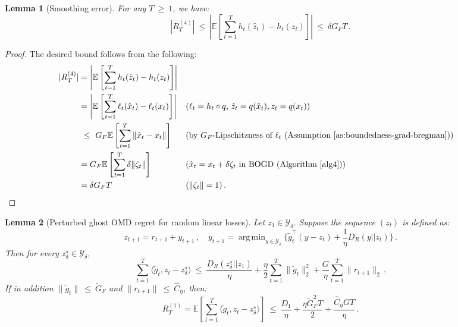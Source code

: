 \documentclass[a4paper,11pt,fullpage]{article}
\def\Y{{\mathcal Y}}
\theoremstyle{plain}
\newtheorem{lemma}{Lemma}
\theoremstyle{definition}
\theoremstyle{plain}
\DeclareMathOperator*{\argmin}{arg\,min}
\renewcommand{\leq}{~\le~}
\renewcommand{\geq}{~\ge~}
\begin{document}
\begin{tcolorbox}[colframe=white!,
top=2pt,left=2pt,right=2pt,bottom=2pt]
\begin{lemma}[Smoothing error]
\label{lem:smoothing-error}
For any $T \geq 1$, we have: 
\begin{equation*}
|R_T^{(4)}| \leq \left| \mathbb{E}\left[ \sum_{t=1}^T h_t(\hat{z}_t) - h_t(z_t) \right] \right| \leq \delta G_F T\,.
\end{equation*}
\end{lemma}
\end{tcolorbox}

\begin{proof}
The desired bound follows from the following: 
\begin{align}
|R_T^{(4)}| &= \left| \mathbb{E}\left[ \sum_{t=1}^T h_t(\hat{z}_t) - h_t(z_t) \right] \right|\nonumber\\
&= \left| \mathbb{E}\left[ \sum_{t=1}^T \ell_t(\hat{x}_t) - \ell_t(x_t) \right] \right|&&\hfill \text{($\ell_t = h_t \circ q$, $\hat{z}_t = q(\hat{x}_t), z_t = q(x_t)$)}\nonumber\\
&\leq G_F \mathbb{E}\left[ \sum_{t=1}^T \|\hat{x}_t - x_t\| \right]
&&\hfill \text{(by $G_F$-Lipschitzness of $\ell_t$ (Assumption~\ref{as:boundedness-grad-bregman}))}\nonumber\\
&= G_F \mathbb{E}\left[ \sum_{t=1}^T \delta \|\zeta_t\| \right] &&\hfill \text{($\hat{x}_t = x_t + \delta \zeta_t$ in BOGD (Algorithm~\ref{alg4}))}\nonumber\\
&= \delta G_F T&&\hfill \text{($\|\zeta_t\| = 1$)}\,.
\end{align}
\end{proof}

\begin{tcolorbox}[colframe=white!,
top=2pt,left=2pt,right=2pt,bottom=2pt]
\begin{lemma}[Perturbed ghost OMD regret for random linear losses]
\label{lem:perturbed-omd-reg-random-lin-loss}
Let $z_1 \in \Y_{\delta}.$ Suppose the sequence $(z_t)$ is defined as: 
\begin{equation*}
z_{t+1} = r_{t+1} + y_{t+1}\,, \quad y_{t+1} = \argmin_{y \in \Y_{\delta}} \{ \tilde{g}_t^{\top} (y - z_t) + \frac{1}{\eta} D_R(y||z_t)\}\,.
\end{equation*}
Then for every $z_{\delta}^{\star} \in \Y_{\delta},$
\begin{equation*}
\sum_{t=1}^T \langle \tilde{g}_t, z_t - z_{\delta}^{\star} \rangle 
\leq \frac{D_R(z_{\delta}^{\star}||z_1)}{\eta} + \frac{\eta}{2} \sum_{t=1}^T \|\tilde{g}_t\|_2^2 + \frac{G}{\eta} \sum_{t=1}^T \|r_{t+1}\|_2\,.
\end{equation*}
If in addition $\|\tilde{g}_t\| \leq \tilde{G}_F$ and $\|r_{t+1}\| \leq \hat{C}_{\eta}$, then: 
\begin{equation}
\label{eq:R1T-bandit}
R_T^{(1)} = \mathbb{E}\left[ \sum_{t=1}^T \langle \tilde{g}_t, z_t - z_{\delta}^{\star} \rangle\right] \leq \frac{D_1}{\eta} + \frac{\eta \tilde{G}_F^2T}{2} + \frac{\hat{C}_{\eta} G T}{\eta}\,.
\end{equation}
\end{lemma}
\end{tcolorbox}
\end{document}
